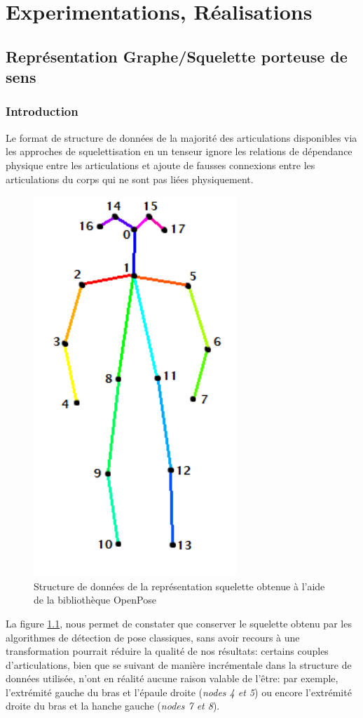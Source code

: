 \clearpage
\chapter{Experimentations, Réalisations}
\label{sec:SOTA}

\section{Représentation Graphe/Squelette porteuse de sens}
\label{dfs}
\subsection{Introduction}
Le format de structure de données de la majorité des articulations disponibles via les approches de squelettisation en un tenseur ignore les relations de dépendance physique entre les articulations et ajoute de fausses connexions entre les articulations du corps qui ne sont pas liées physiquement.

\begin{figure}[H]
    \centering
    \includegraphics[width=0.3\linewidth]{Images/openpose.png}
    \caption{Structure de données de la représentation squelette obtenue à l'aide de la bibliothèque OpenPose \cite{cao2017realtime}}
    \label{fig:openPoseSkel}
\end{figure}

La figure \ref{fig:openPoseSkel}, nous permet de constater que conserver le squelette obtenu par les algorithmes de détection de pose classiques, sans avoir recours à une transformation pourrait réduire la qualité de nos résultats: certains couples d'articulations, bien que se suivant de manière incrémentale dans la structure de données utilisée, n'ont en réalité aucune raison valable de l'être: par exemple, l'extrémité gauche du bras et l'épaule droite (\textit{nodes 4 et 5}) ou encore l'extrémité droite du bras et la hanche gauche (\textit{nodes 7 et 8}).


